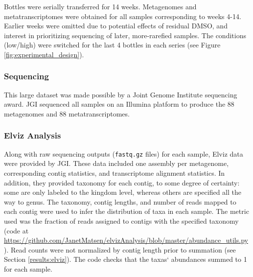 Bottles were serially transferred for 14 weeks.
Metagenomes and metatranscriptomes were obtained for all samples corresponding to weeks 4-14.
Earlier weeks were omitted due to potential effects of residual DMSO, and interest in prioritizing sequencing of later, more-rarefied samples.
The  conditions (low/high) were switched for the last 4 bottles in each series (see Figure \ref{fig:experimental_design}).

\subsubsection{Sequencing}  %
This large dataset was made possible by a Joint Genome Institute sequencing award. %
JGI sequenced all samples on an Illumina platform to produce the 88 metagenomes and 88 metatranscriptomes.

\subsubsection{Elviz Analysis}  %
Along with raw sequencing outputs (\texttt{fastq.gz} files) for each sample, Elviz data \cite{cantor2015} were provided by JGI.
These data included one assembly per metagenome, corresponding contig statistics, and transcriptome alignment statistics.
In addition, they provided taxonomy for each contig, to some degree of certainty: some are only labeled to the kingdom level, whereas others are specified all the way to genus.
The taxonomy, contig lengths, and number of reads mapped to each contig were used to infer the distribution of taxa in each sample.
The metric used was the fraction of reads assigned to contigs with the specified taxonomy (code at \url{https://github.com/JanetMatsen/elvizAnalysis/blob/master/abundance_utils.py}).
Read counts were not normalized by contig length prior to summation (see Section \ref{results:elviz}).
The code checks that the taxas` abundances summed to 1 for each sample.

